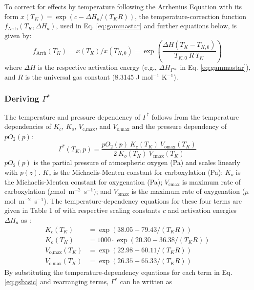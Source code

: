 \documentclass{myreport}
\begin{document}
To correct for effects by temperature following the Arrhenius Equation with its form $x(T_K)=\exp(c-\Delta H_a/(T_K R))$, the temperature-correction function $f_{\text{Arrh}}(T_K, \Delta H_a)$, used in Eq. \ref{eq:gammastar} and further equations below, is given by:
\begin{equation}
    f_{\text{Arrh}}(T_K) = x(T_K)/x(T_{K,0}) = \exp \left( \frac{\Delta H (T_K - T_{K,0})}{T_{K,0}\: R\: T_K} \right) 
\end{equation}
where $\Delta H$ is the respective activation energy (e.g., $\Delta H_{\Gamma\ast}$ in Eq. \ref{eq:gammastar}), and $R$ is the universal gas constant (8.3145 J mol$^{-1}$ K$^{-1}$).

\subsubsection{Deriving $\Gamma^\ast$}
The temperature and pressure dependency of $\Gamma^\ast$ follows from the temperature dependencies of $K_c$, $K_o$, $V_\text{c,max}$, and $V_\text{o,max}$ and the pressure dependency of $pO_2(p)$:
\begin{equation}
\label{eq:gsbasic}
    \Gamma^\ast (T_K, p) = \frac{pO_2(p)\: K_c(T_K)\: V_\text{omax}(T_K)}
                        {2\: K_o(T_K)\: V_\text{cmax}(T_K)}
\end{equation}
$pO_2(p)$ is the partial pressure of atmospheric oxygen (Pa) and scales linearly with $p(z)$. $K_c$ is the Michaelis-Menten constant for carboxylation (Pa); $K_o$ is the Michaelis-Menten constant for oxygenation (Pa); $V_\text{cmax}$ is maximum rate of carboxylation ($\mu$mol~m$^{-2}$~s$^{-1}$); and $V_\text{omax}$ is the maximum rate of oxygenation ($\mu$mol~m$^{-2}$~s$^{-1}$). The temperature-dependency equations for these four terms are given in Table 1 of \citet{bernacchi01} with respective scaling constants $c$ and activation energies $\Delta H_a$ as :
\begin{subequations}
\begin{align}
    K_c(T_K) &= \exp(38.05-79.43/(T_K R)) \\
    K_o(T_K) &= 1000 \cdot \exp(20.30-36.38/(T_K R)) \\
    V_\text{o,max}(T_K) &= \exp(22.98-60.11/(T_K R)) \\
    V_\text{c,max}(T_K) &= \exp(26.35-65.33/(T_K R))
\end{align}
\end{subequations}
By substituting the temperature-dependency equations for each term in Eq. \ref{eq:gsbasic} and rearranging terms, $\Gamma^\ast$ can be written as
\end{document}
